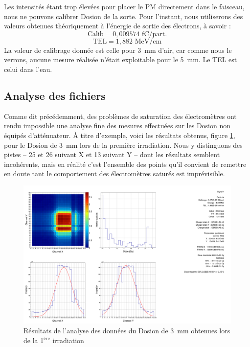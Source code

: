 \documentclass[a4paper,11pt]{article}
\begin{document}
Les intensités étant trop élevées pour placer le PM directement dans le faisceau, nous ne pouvons calibrer Dosion de la sorte. 
Pour l'instant, nous utiliserons des valeurs obtenues théoriquement à l'énergie de sortie des électrons, à savoir : 
$$\text{Calib}=0,009574\text{ fC/part.}$$
$$\text{TEL}=1,882\text{ MeV/cm}$$
La valeur de calibrage donnée est celle pour 3~mm d'air, car comme nous le verrons, aucune mesure réalisée n'était exploitable pour le 5~mm.
Le TEL est celui dans l'eau.

\subsection*{Analyse des fichiers}

Comme dit précédemment, des problèmes de saturation des électromètres ont rendu impossible une analyse fine des mesures effectuées sur les Dosion non équipés d'atténuateur.
\`A titre d'exemple, voici les résultats obtenus, figure \ref{fig:area_sat}, pour le Dosion de 3~mm lors de la première irradiation.
Nous y distinguons des pistes -- 25 et 26 suivant X et 13 suivant Y -- dont les résultats semblent incohérents, mais en réalité c'est l'ensemble des points qu'il convient de remettre en doute tant le comportement des électromètres saturés est imprévisible.
\begin{figure}[h]
\begin{center}
\includegraphics[width=\linewidth]{Area_1_sat.png} 
\caption{\label{fig:area_sat}\footnotesize{Résultats de l'analyse des données du Dosion de 3~mm obtenues lors de la 1$^{\text{ère}}$ irradiation}}
\end{center}
\end{figure}
\end{document}
